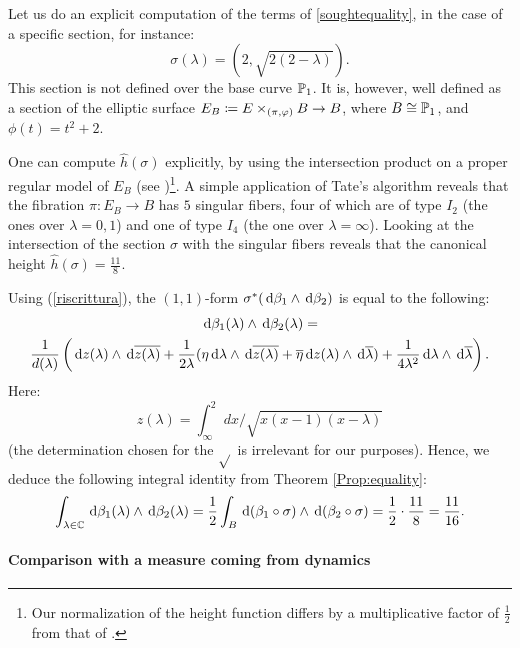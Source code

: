 \documentclass[a4paper,12pt]{article}
\theoremstyle{remark}
\begin{document}
\begin{example}\label{explicitexample}
	Let us do an explicit computation of the terms of \ref{soughtequality}, in the case of a specific section, for instance:
	\[
	\sigma(\lambda)=(2,\sqrt{2(2-\lambda)}).
	\]
	This section is not defined over the base curve $\P_1$. It is, however, well defined as a section of the elliptic surface $E_B \defeq E \times_{(\pi,\phi)}B \rightarrow B$, where $B \cong \P_1$, and $\phi(t)=t^2+2$. 
	
	One can compute $\hat{h}(\sigma)$ explicitly, by using the intersection product on a proper regular model of $E_B$ (see \cite[Section 11.8]{ellipticsurfaces})\footnote{Our normalization of the height function differs by a multiplicative factor of $\frac{1}{2}$ from that of \cite{ellipticsurfaces}.}. A simple application of Tate's algorithm reveals that the fibration $\pi:E_B \rightarrow B$ has $5$ singular fibers, four of which are of type $I_2$ (the ones over $\lambda= 0,1$) and one of type $I_4$ (the one over $\lambda=\infty$). Looking at the intersection of the section $\sigma$ with the singular fibers reveals that the canonical height $\hat{h}(\sigma)=\frac{11}{8}$.
	
	Using (\ref{riscrittura}), the $(1,1)$-form $\sigma^*(\de \beta_1 \wedge \de \beta_2)$ is equal to the following:
	\begin{gather}\label{Expr:11formexample}
	\de \beta_1(\lambda) \wedge \de \beta_2(\lambda)=\\ \frac{1}{d(\lambda)}\left(\de z(\lambda) \wedge \de \overline{z(\lambda)}+\frac{1}{2\lambda}(\eta \de \lambda \wedge \de \overline{z(\lambda)}+\overline{\eta}\de{z(\lambda)}\wedge\de{\overline{\lambda}})+\frac{1}{4\lambda^2}\de \lambda \wedge \de \overline{\lambda}\right).
	\end{gather}
	Here:
	\begin{equation}
		z(\lambda)=\int_{\infty}^{2}dx/\sqrt{x(x-1)(x-\lambda)}
	\end{equation}
	(the determination chosen for the $\sqrt{}$ is irrelevant for our purposes). 
	Hence, we deduce the following integral identity from Theorem \ref{Prop:equality}:
	\[
	\int_{\lambda \in \C} \de \beta_1(\lambda) \wedge \de \beta_2(\lambda) = \frac{1}{2}	\int_{B} \de (\beta_1\circ \sigma) \wedge \de (\beta_2\circ \sigma)=\frac{1}{2}\cdot \frac{11}{8}=\frac{11}{16}.
	\]
\end{example}

\paragraph{Comparison with a measure coming from dynamics}
\end{document}

